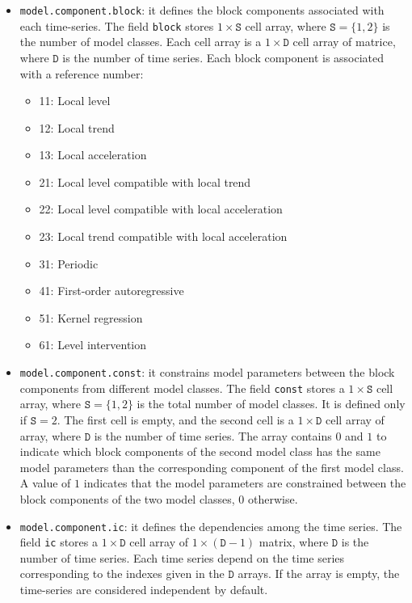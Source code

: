 \begin{itemize}

\item \lstinline[basicstyle = \mlttfamily \small ]!model.component.block!: it defines the block components associated with each time-series.
The field \lstinline[basicstyle = \mlttfamily \small ]!block! stores $1\times \mathtt{S}$ cell array, where $\mathtt{S} = \{1,2 \}$ is the number of model classes.
Each cell array is a $1\times \mathtt{D}$ cell array of matrice, where $\mathtt{D}$ is the number of time series.
Each block component is associated with a reference number:
\begin{itemize}
\item 11: Local level 
\item 12: Local trend
\item 13: Local acceleration
\item 21: Local level compatible with local trend
\item 22: Local level compatible with local acceleration
\item 23: Local trend compatible with local acceleration
\item 31: Periodic
\item 41: First-order autoregressive
\item 51: Kernel regression
\item 61: Level intervention
\end{itemize}

\item  \lstinline[basicstyle = \mlttfamily \small ]!model.component.const!: it constrains model parameters between the block components from different model classes.
The field \lstinline[basicstyle = \mlttfamily \small ]!const! stores a $1\times \mathtt{S}$ cell array, where $\mathtt{S} = \{1, 2 \}$ is the total number of model classes.
It is defined only if $\mathtt{S} = 2$.
The first cell is empty, and the second cell is a $1\times \mathtt{D}$ cell array of array, where $\mathtt{D}$ is the number of time series.
The array contains $0$ and $1$ to indicate which block components of the second model class has the same model parameters than the corresponding component of the first model class. 
A value of $1$ indicates that the model parameters are constrained between the block components of the two model classes, $0$ otherwise.

\item  \lstinline[basicstyle = \mlttfamily \small ]!model.component.ic!:  it defines the dependencies among the time series.
The field \lstinline[basicstyle = \mlttfamily \small ]!ic! stores a $1\times \mathtt{D}$ cell array of $1\times (\mathtt{D}-1)$ matrix, where $\mathtt{D}$ is the number of time series.
Each time series depend on the time series corresponding to the indexes given in the $\mathtt{D}$ arrays.
If the array is empty, the time-series are considered independent by default.

\end{itemize}


